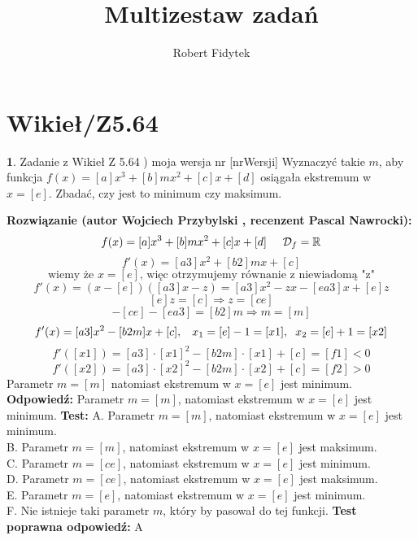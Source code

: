 \documentclass[12pt, a4paper]{article}
\title{Multizestaw zadań}
\author{Robert Fidytek}
\date{}
\theoremstyle{definition} %
\newtheorem{zad}{}
\newcommand{\kategoria}[1]{\section{#1}} %
\newcommand{\zadStart}[1]{\begin{zad}#1\newline} %
\newcommand{\zadStop}{\end{zad}}   %
\newcommand{\rozwStart}[2]{\noindent \textbf{Rozwiązanie (autor #1 , recenzent #2): }\newline} %
\newcommand{\rozwStop}{\newline}                                            %
\newcommand{\odpStart}{\noindent \textbf{Odpowiedź:}\newline}    %
\newcommand{\odpStop}{\newline}                                             %
\newcommand{\testStart}{\noindent \textbf{Test:}\newline} %
\newcommand{\testStop}{\newline} %
\newcommand{\kluczStart}{\noindent \textbf{Test poprawna odpowiedź:}\newline} %
\newcommand{\kluczStop}{\newline} %
\begin{document}
\maketitle


\kategoria{Wikieł/Z5.64}
\zadStart{Zadanie z Wikieł Z 5.64 ) moja wersja nr [nrWersji]}
Wyznaczyć takie $m$, aby funkcja $f(x)=[a]x^{3}+[b]mx^{2}+[c]x+[d]$ osiągała ekstremum w $x=[e]$. Zbadać, czy jest to minimum czy maksimum.
\zadStop
\rozwStart{Wojciech Przybylski}{Pascal Nawrocki}
$$ f(x)=[a]x^{3}+[b]mx^{2}+[c]x+[d]\hspace{5mm} \mathcal{D}_{f}=\mathbb{R}$$
$$ f'(x)=[a3]x^{2}+[b2]mx+[c]$$
$$\mbox{ wiemy że } x=[e] \mbox{, więc otrzymujemy równanie z niewiadomą "z" }$$
$$f'(x)=(x-[e])([a3]x-z)=[a3]x^{2}-zx-[ea3]x+[e]z$$
$$[e]z=[c]\Rightarrow z=[ce]$$
$$-[ce]-[ea3]=[b2]m \Rightarrow m=[m]$$
$$f'(x)=[a3]x^{2}-[b2m]x+[c],\hspace{3mm}x_{1}=[e]-1=[x1],\hspace{2mm} x_{2}=[e]+1=[x2]$$
$$f'([x1])=[a3]\cdot[x1]^{2}-[b2m]\cdot[x1]+[c]=[f1]<0$$
$$f'([x2])=[a3]\cdot[x2]^{2}-[b2m]\cdot[x2]+[c]=[f2]>0$$
Parametr $m=[m]$ natomiast ekstremum w $x=[e]$ jest minimum.
\rozwStop
\odpStart
Parametr $m=[m]$, natomiast ekstremum w $x=[e]$ jest minimum.
\odpStop
\testStart
A. Parametr $m=[m]$, natomiast ekstremum w $x=[e]$ jest minimum.\\
B. Parametr $m=[m]$, natomiast ekstremum w $x=[e]$ jest maksimum.\\
C. Parametr $m=[ce]$, natomiast ekstremum w $x=[e]$ jest minimum.\\
D. Parametr $m=[ce]$, natomiast ekstremum w $x=[e]$ jest maksimum.\\
E. Parametr $m=[e]$, natomiast ekstremum w $x=[e]$ jest minimum.\\
F. Nie istnieje taki parametr $m$, który by pasował do tej funkcji.
\testStop
\kluczStart
A
\kluczStop
\end{document}
